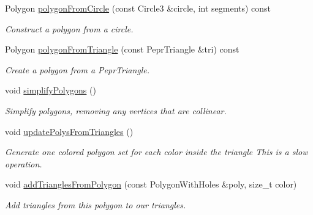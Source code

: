 \begin{DoxyCompactItemize}
Polygon \mbox{\hyperlink{classpepr3d_1_1_triangle_detail_aed92acb55850155cbc54142653afbcc4}{polygon\+From\+Circle}} (const Circle3 \&circle, int segments) const
\begin{DoxyCompactList}\small\item\em Construct a polygon from a circle. \end{DoxyCompactList}\item 
\mbox{\label{classpepr3d_1_1_triangle_detail_a01d113a2666085931fc5d6ff28ae57df}} 
Polygon \mbox{\hyperlink{classpepr3d_1_1_triangle_detail_a01d113a2666085931fc5d6ff28ae57df}{polygon\+From\+Triangle}} (const Pepr\+Triangle \&tri) const
\begin{DoxyCompactList}\small\item\em Create a polygon from a Pepr\+Triangle. \end{DoxyCompactList}\item 
\mbox{\label{classpepr3d_1_1_triangle_detail_a8b6a41c7c881886bde6d1543beac68c8}} 
void \mbox{\hyperlink{classpepr3d_1_1_triangle_detail_a8b6a41c7c881886bde6d1543beac68c8}{simplify\+Polygons}} ()
\begin{DoxyCompactList}\small\item\em Simplify polygons, removing any vertices that are collinear. \end{DoxyCompactList}\item 
\mbox{\label{classpepr3d_1_1_triangle_detail_a3a0599a7b678c981256cfc1a2a720dd4}} 
void \mbox{\hyperlink{classpepr3d_1_1_triangle_detail_a3a0599a7b678c981256cfc1a2a720dd4}{update\+Polys\+From\+Triangles}} ()
\begin{DoxyCompactList}\small\item\em Generate one colored polygon set for each color inside the triangle This is a slow operation. \end{DoxyCompactList}\item 
\mbox{\label{classpepr3d_1_1_triangle_detail_a9e9541120fb03635e37a298df6a60dc3}} 
void \mbox{\hyperlink{classpepr3d_1_1_triangle_detail_a9e9541120fb03635e37a298df6a60dc3}{add\+Triangles\+From\+Polygon}} (const Polygon\+With\+Holes \&poly, size\+\_\+t color)
\begin{DoxyCompactList}\small\item\em Add triangles from this polygon to our triangles. \end{DoxyCompactList}\item 

\end{DoxyCompactItemize}
